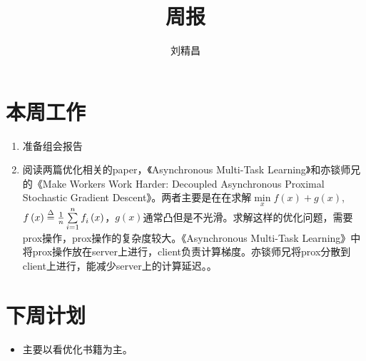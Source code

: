 \documentclass{ctexart}
\begin{document}
\title{周报}
\author{刘精昌}
\maketitle
\fangsong

\section*{本周工作}
\begin{enumerate}
  \item 准备组会报告
  \item 阅读两篇优化相关的paper，《Asynchronous Multi-Task Learning》和亦锬师兄的《Make Workers Work Harder: Decoupled Asynchronous Proximal Stochastic Gradient Descent》。两者主要是在在求解$\mathop {\min }\limits_x f\left( x \right) + g\left( x \right)$, $f\left( x \right) \buildrel \Delta \over = \frac{1}{n}\sum\limits_{i = 1}^n {\mathop f\nolimits_i \left( x \right)} $，$g(x)$通常凸但是不光滑。求解这样的优化问题，需要prox操作，prox操作的复杂度较大。《Asynchronous Multi-Task Learning》中将prox操作放在server上进行，client负责计算梯度。亦锬师兄将prox分散到client上进行，能减少server上的计算延迟。。
\end{enumerate}

\section*{下周计划}
\begin{itemize}
  \item 主要以看优化书籍为主。
\end{itemize}
\end{document}
